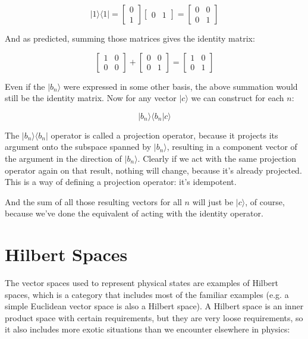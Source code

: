 $$
|1 \rangle \langle 1| = 
\begin{bmatrix} 0 \\ 1 \end{bmatrix}
\begin{bmatrix} 0 & 1 \end{bmatrix} =
\begin{bmatrix} 0 & 0 \\ 0 & 1 \end{bmatrix}
$$

And as predicted, summing those matrices gives the identity matrix:

$$
\begin{bmatrix} 1 & 0 \\ 0 & 0 \end{bmatrix} +
\begin{bmatrix} 0 & 0 \\ 0 & 1 \end{bmatrix} =
\begin{bmatrix} 1 & 0 \\ 0 & 1 \end{bmatrix}
$$

Even if the $|b_n \rangle$ were expressed in some other basis, the above summation would still be the identity matrix. Now for any vector $|c \rangle$ we can construct for each $n$:

$$|b_n \rangle \langle b_n | c \rangle$$

The $|b_n \rangle \langle b_n|$ operator is called a projection operator, because it projects its argument onto the subspace spanned by $|b_n \rangle$, resulting in a component vector of the argument in the direction of $|b_n \rangle$. Clearly if we act with the same projection operator again on that result, nothing will change, because it's already projected. This is a way of defining a projection operator: it's idempotent.

And the sum of all those resulting vectors for all $n$ will just be $|c \rangle$, of course, because we've done the equivalent of acting with the identity operator.

\section{Hilbert Spaces}

The vector spaces used to represent physical states are examples of Hilbert spaces, which is a category that includes most of the familiar examples (e.g. a simple Euclidean vector space is also a Hilbert space). A Hilbert space is an inner product space with certain requirements, but they are very loose requirements, so it also includes more exotic situations than we encounter elsewhere in physics:

